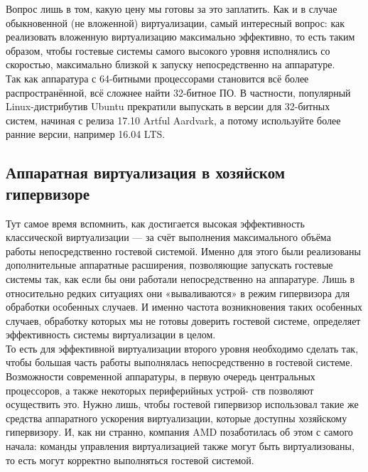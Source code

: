 \documentclass[14pt, a4paper]{article}
\begin{document}
Вопрос лишь в том, какую цену мы готовы за это заплатить. Как и в случае обыкновенной (не
вложенной) виртуализации, самый интересный вопрос: как реализовать вложенную виртуализацию
максимально эффективно, то есть таким образом, чтобы гостевые системы самого высокого уровня
исполнялись со скоростью, максимально близкой к запуску непосредственно на аппаратуре.\\

Так как аппаратура с 64-битными процессорами становится всё более распространённой, всё
сложнее найти 32-битное ПО. В частности, популярный Linux-дистрибутив Ubuntu прекратили
выпускать в версии для 32-битных систем, начиная с релиза 17.10 Artful Aardvark, а потому
используйте более ранние версии, например 16.04 LTS.

\subsection*{Аппаратная виртуализация в хозяйском гипервизоре}

Тут самое время вспомнить, как достигается высокая эффективность классической виртуализации —
за счёт выполнения максимального объёма работы непосредственно гостевой системой. Именно для
этого были реализованы дополнительные аппаратные расширения, позволяющие запускать гостевые
системы так, как если бы они работали непосредственно на аппаратуре. Лишь в относительно редких
ситуациях они «вываливаются» в режим гипервизора для обработки особенных случаев. И именно
частота возникновения таких особенных случаев, обработку которых мы не готовы доверить гостевой
системе, определяет эффективность системы виртуализации в целом.\\

То есть для эффективной виртуализации второго уровня необходимо сделать так, чтобы большая
часть работы выполнялась непосредственно в гостевой системе. Возможности современной аппаратуры, 
в первую очередь центральных процессоров, а также некоторых периферийных
устрой- ств позволяют осуществить это. Нужно лишь, чтобы гостевой гипервизор использовал такие же
средства аппаратного ускорения виртуализации, которые доступны хозяйскому гипервизору. И, как ни
странно, компания AMD позаботилась об этом с самого начала: команды управления виртуализацией
также могут быть виртуализованы, то есть могут корректно выполняться гостевой системой.\\
\end{document}
